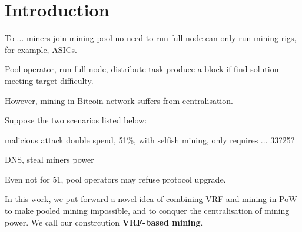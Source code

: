 \section{Introduction}




To ... 
miners join mining pool
no need to run full node 
can only run mining rigs, for example, ASICs.

Pool operator, run full node, distribute task
produce a block if find solution meeting target difficulty.

However, mining in Bitcoin network suffers from centralisation.



Suppose the two scenarios listed below:



malicious attack
double spend, 51\%, with selfish mining, only requires ... 33?25?

DNS, steal miners power


Even not for 51, 
pool operators may refuse protocol upgrade. 


In this work, we put forward a novel idea of combining VRF and mining in PoW to make pooled mining impossible, and to conquer the centralisation of mining power.
We call our constrcution \textbf{VRF-based mining}.